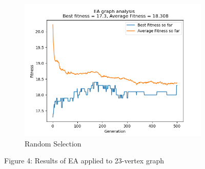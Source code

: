 \documentclass[conference,compsoc]{IEEEtran}
\begin{document}
\begin{figure}
\begin{subfigure}{0.34\textwidth}
    \includegraphics[width=\linewidth]{../Results/_23_Random_Truncation_100_50_500.png}
    \caption{Random Selection}
  \end{subfigure}
  \caption*{Figure 4: Results of EA applied to 23-vertex graph}
\end{figure}
\end{document}
